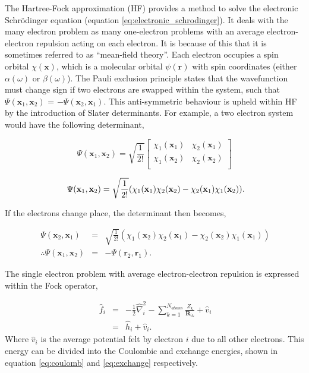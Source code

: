 The Hartree-Fock approximation (HF) provides a method to solve the electronic Schr\"odinger equation (equation \ref{eq:electronic_schrodinger}).  It deals with the many electron problem as many one-electron problems with an average electron-electron repulsion acting on each electron.  It is because of this that it is sometimes referred to as ``mean-field theory''.  Each electron occupies a spin orbital $\chi(\mathbf{x})$, which is a molecular orbital $\psi(\mathbf{r})$ with spin coordinates (either $\alpha(\omega)$ or $\beta(\omega)$)\cite{skylaris_lecture}.  The Pauli exclusion principle states that the wavefunction must change sign if two electrons are swapped within the system\cite{OCP_comp_chem}, such that $\Psi(\mathbf{x}_1, \mathbf{x}_2)$ = $-\Psi(\mathbf{x}_2, \mathbf{x}_1)$.  This anti-symmetric behaviour is upheld within HF by the introduction of Slater determinants.  For example, a two electron system would have the following determinant,

\begin{equation}
\Psi(\mathbf{x}_1, \mathbf{x}_2) = \sqrt{\frac{1}{2!}}
	\begin{bmatrix}
		\chi_1(\mathbf{x}_1) & \chi_2(\mathbf{x}_1) \\
		\chi_1(\mathbf{x}_2) & \chi_2(\mathbf{x}_2) \\
	\end{bmatrix}
\end{equation}

\begin{equation}
\ \Psi(\mathbf{x}_1, \mathbf{x}_2) = \sqrt{\frac{1}{2!}} ( \chi_1(\mathbf{x}_1)\chi_2(\mathbf{x}_2) - \chi_2(\mathbf{x}_1)\chi_1(\mathbf{x}_2)) \\.
\end{equation}

If the electrons change place, the determinant then becomes,

\begin{eqnarray}
\ \Psi(\mathbf{x}_2, \mathbf{x}_1) &=& \sqrt{\frac{1}{2!}} ( \chi_1(\mathbf{x}_2)\chi_2(\mathbf{x}_1) - \chi_2(\mathbf{x}_2)\chi_1(\mathbf{x}_1)) \\
\ \therefore \Psi(\mathbf{x}_1, \mathbf{x}_2) &=& -\Psi(\mathbf{r}_2, \mathbf{r}_1) .
\end{eqnarray}

The single electron problem with average electron-electron repulsion is expressed within the Fock operator, 

\begin{eqnarray}
\ \hat{f}_i &=& -  \frac{1}{2} \hat{\nabla}^2_i - \sum_{k=1}^{N_{atoms}} \frac{Z_{k}}{\mathbf{R}_{ik}} + \hat{v}_{i} \\
\ &=& \hat{h}_i + \hat{v}_{i} .
\end{eqnarray}
%
Where $\hat{v}_{i}$ is the average potential felt by electron $i$ due to all other electrons.  This energy can be divided into the Coulombic and exchange energies, shown in equation \ref{eq:coulomb} and \ref{eq:exchange} respectively.


